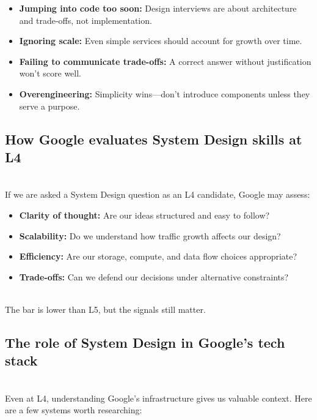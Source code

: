 \begin{itemize}
\item
\protect{}\label{UGShiW9K0IJEORQweCjz9}
\textbf{Jumping into code too soon:} Design interviews are about architecture and trade-offs, not implementation.
\item
\protect{}\label{fpue5FrdKMANegXkxSVjg}
\textbf{Ignoring scale:} Even simple services should account for growth over time.
\item
\protect{}\label{h8TTKQDd8zfVp-6gJzWjp}
\textbf{Failing to communicate trade-offs:} A correct answer without justification won't score well.
\item
\protect{}\label{uuiEV6l-d-wvQNVERTz5r}
\textbf{Overengineering:} Simplicity wins---don't introduce components unless they serve a purpose.
\end{itemize}

\subsection{How Google evaluates System Design skills at L4}\label{tyX9UFzeNLXBaPG7alWSt}
\\
If we are asked a System Design question as an L4 candidate, Google may assess:

\begin{itemize}
\item
\protect{}\label{xhIsFFc1EvqE7uBv3Md6Z}
\textbf{Clarity of thought:} Are our ideas structured and easy to follow?
\item
\protect{}\label{4eOjg1oXZKCl6PL1RvCiY}
\textbf{Scalability:} Do we understand how traffic growth affects our design?
\item
\protect{}\label{mA13lVkwH84kSsEOlTefx}
\textbf{Efficiency:} Are our storage, compute, and data flow choices appropriate?
\item
\protect{}\label{wN255n8I_WL8mKyOmloVg}
\textbf{Trade-offs:} Can we defend our decisions under alternative constraints?
\end{itemize}
\\
The bar is lower than L5, but the signals still matter.

\subsection{The role of System Design in Google's tech stack}\label{8SYjaJOGVUvI-aG6gzkK6}
\\
Even at L4, understanding Google's infrastructure gives us valuable context. Here are a few systems worth researching:

